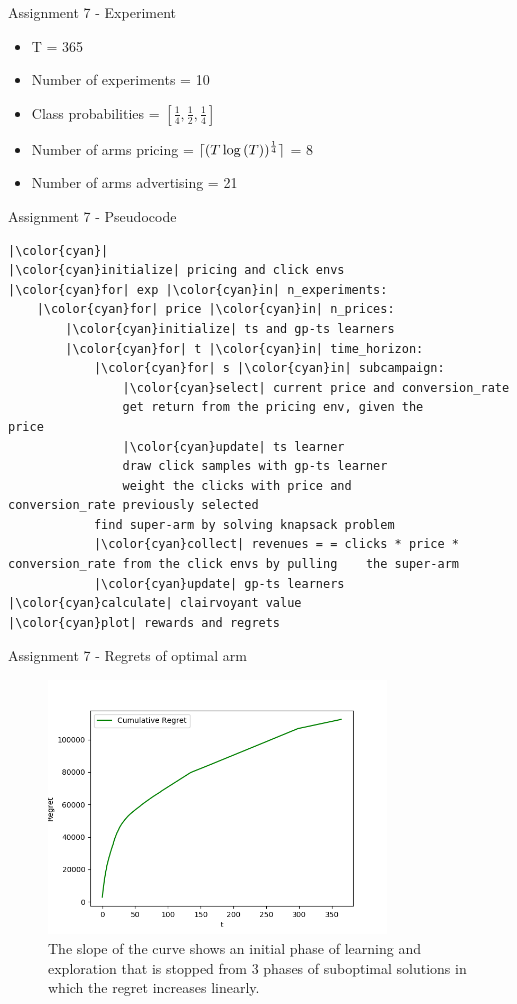 \documentclass[11pt]{beamer}
\DeclarePairedDelimiter{\ceil}{\lceil}{\rceil}
\begin{document}
\begin{frame}{Assignment 7 - Experiment}
\begin{itemize}
\item T = 365
\item Number of experiments = 10
\item Class probabilities = \( \left[ \frac{1}{4}, \frac{1}{2}, \frac{1}{4} \right] \)
\item Number of arms pricing = $\ceil{(T \log{(T)})^{\frac{1}{4}}}$ = 8
\item Number of arms advertising = 21
\end{itemize}
\end{frame}

\begin{frame}[fragile]{Assignment 7 - Pseudocode}
\begin{lstlisting}
|\color{cyan}|
|\color{cyan}initialize| pricing and click envs
|\color{cyan}for| exp |\color{cyan}in| n_experiments:
	|\color{cyan}for| price |\color{cyan}in| n_prices:
		|\color{cyan}initialize| ts and gp-ts learners 
		|\color{cyan}for| t |\color{cyan}in| time_horizon:
			|\color{cyan}for| s |\color{cyan}in| subcampaign:
				|\color{cyan}select| current price and conversion_rate 
				get return from the pricing env, given the				price
				|\color{cyan}update| ts learner
				draw click samples with gp-ts learner
				weight the clicks with price and                   conversion_rate previously selected
			find super-arm by solving knapsack problem
			|\color{cyan}collect| revenues = = clicks * price *             conversion_rate from the click envs by pulling    the super-arm
			|\color{cyan}update| gp-ts learners 
|\color{cyan}calculate| clairvoyant value
|\color{cyan}plot| rewards and regrets
\end{lstlisting}
\end{frame}

\begin{frame}{Assignment 7 - Regrets of optimal arm}
\begin{figure}[hbtp]
\centering
\includegraphics[width=0.8\textwidth]{images/assignment_7_regrets_arm_3_cum_regret.png}
\caption{The slope of the curve shows an initial phase of learning and exploration that is stopped from 3 phases of suboptimal solutions in which the regret increases linearly.}
\end{figure}
\end{frame}
\end{document}
